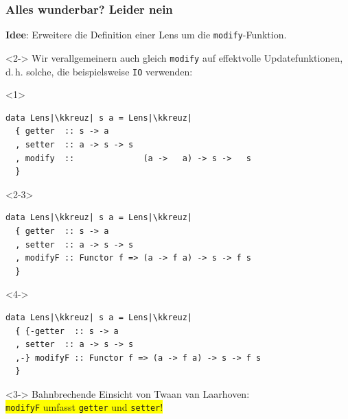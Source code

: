 \documentclass{beamer}
\newcommand{\kkreuz}{$\,^\ddag$} %
\newcommand{\hask}[1]{\texttt{#1}} %
\begin{document}
\begin{frame}[fragile]
  \frametitle{Alles wunderbar? Leider nein}
  \textbf{Idee}: Erweitere die Definition einer Lens um die \hask{modify}-Funktion. \\
  \begin{visibleenv}<2->
    Wir verallgemeinern auch gleich \hask{modify} auf effektvolle Updatefunktionen, d.\,h. solche, die beispielsweise \hask{IO} verwenden:
  \end{visibleenv}
  \begin{onlyenv}<1>
\begin{verbatim}
data Lens|\kkreuz| s a = Lens|\kkreuz|
  { getter  :: s -> a
  , setter  :: a -> s -> s
  , modify  ::              (a ->   a) -> s ->   s
  }
\end{verbatim}
  \end{onlyenv}
  \begin{onlyenv}<2-3>
\begin{verbatim}
data Lens|\kkreuz| s a = Lens|\kkreuz|
  { getter  :: s -> a
  , setter  :: a -> s -> s
  , modifyF :: Functor f => (a -> f a) -> s -> f s
  }
\end{verbatim}
  \end{onlyenv}
  \begin{onlyenv}<4->
\begin{verbatim}
data Lens|\kkreuz| s a = Lens|\kkreuz|
  { {-getter  :: s -> a
  , setter  :: a -> s -> s
  ,-} modifyF :: Functor f => (a -> f a) -> s -> f s
  }
\end{verbatim}
  \end{onlyenv}

  \vspace{2em}

  \begin{onlyenv}<3->
    \Large Bahnbrechende Einsicht von Twaan van Laarhoven: \\

    \colorbox{yellow}{
      \huge \hask{modifyF} umfasst \hask{getter} und \hask{setter}!
    }
  \end{onlyenv}
\end{frame}
\end{document}
